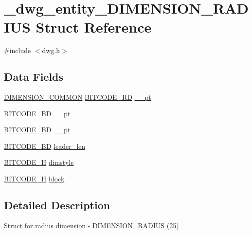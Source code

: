 \hypertarget{struct__dwg__entity__DIMENSION__RADIUS}{\section{\-\_\-dwg\-\_\-entity\-\_\-\-D\-I\-M\-E\-N\-S\-I\-O\-N\-\_\-\-R\-A\-D\-I\-U\-S \-Struct \-Reference}
\label{struct__dwg__entity__DIMENSION__RADIUS}
}


{\ttfamily \#include $<$dwg.\-h$>$}

\subsection*{\-Data \-Fields}
\begin{DoxyCompactItemize}
\item 
\hyperlink{dwg_8h_a334d626d7e4a0a1af39036446dfa82c4}{\-D\-I\-M\-E\-N\-S\-I\-O\-N\-\_\-\-C\-O\-M\-M\-O\-N} \hyperlink{dwg_8h_a1d23a9bc9a02453876b244dc6706f6a6}{\-B\-I\-T\-C\-O\-D\-E\-\_\-R\-D} \hyperlink{struct__dwg__entity__DIMENSION__RADIUS_abcd9764a8926f1d5f8f7574991f77c71}{\-\_\-\_\-pt}
\item 
\hyperlink{dwg_8h_a00698ef1bb072aa0a9360c6fc1c57587}{\-B\-I\-T\-C\-O\-D\-E\-\_\-B\-D} \hyperlink{struct__dwg__entity__DIMENSION__RADIUS_a0ed40585fd36bc3e8f72c6877597e466}{\-\_\-\_\-pt}
\item 
\hyperlink{dwg_8h_a00698ef1bb072aa0a9360c6fc1c57587}{\-B\-I\-T\-C\-O\-D\-E\-\_\-B\-D} \hyperlink{struct__dwg__entity__DIMENSION__RADIUS_aca47456266593e5e6b0a292adbe379f0}{\-\_\-\_\-pt}
\item 
\hyperlink{dwg_8h_a3c1e6781466b74ba07785d57da70ed97}{\-B\-I\-T\-C\-O\-D\-E\-\_\-\-B\-D} \hyperlink{struct__dwg__entity__DIMENSION__RADIUS_a433fa3047c703fcc6d9636ab3d59819b}{leader\-\_\-len}
\item 
\hyperlink{dwg_8h_a7c700e94e047a97ba8c24bdfe4029dc3}{\-B\-I\-T\-C\-O\-D\-E\-\_\-\-H} \hyperlink{struct__dwg__entity__DIMENSION__RADIUS_a6e6b61718722f04b640e54814dcbbcca}{dimstyle}
\item 
\hyperlink{dwg_8h_a7c700e94e047a97ba8c24bdfe4029dc3}{\-B\-I\-T\-C\-O\-D\-E\-\_\-\-H} \hyperlink{struct__dwg__entity__DIMENSION__RADIUS_a15995b5f3c72f68a715dde6488e88c8c}{block}
\end{DoxyCompactItemize}


\subsection{\-Detailed \-Description}
\-Struct for radius dimension -\/ \-D\-I\-M\-E\-N\-S\-I\-O\-N\-\_\-\-R\-A\-D\-I\-U\-S (25) 


